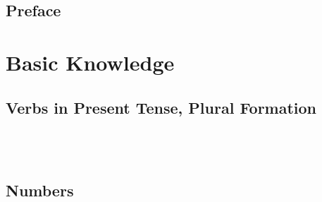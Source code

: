 \documentclass{book}
\title{\q{   }}
\author{Thorsten Renk}
\date{Version 2.0 (September 23, 2008)}
\newcommand{\quetta}[1]{{\formal #1}}
\newcommand{\q}[1]{\quetta{#1}}
\begin{document}
\frontmatter
\maketitle
\tableofcontents

\chapter{Preface}


\mainmatter
\part{Basic Knowledge}
\chapter{Verbs in Present Tense, Plural Formation}



\appendix
\chapter{\q{}}


\chapter{Numbers}


\backmatter
\end{document}
